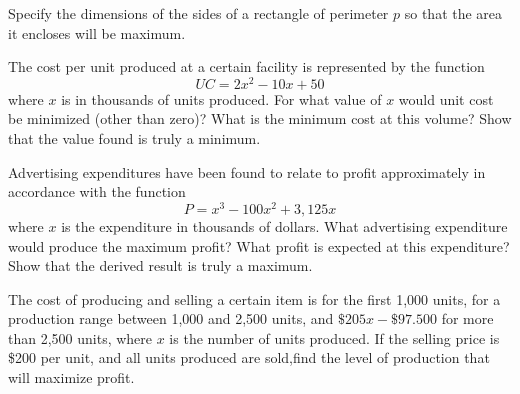 \begin{exercises}
    \begin{exercise}
    \label{sea-09-01}
        Specify the dimensions of the sides of a rectangle of perimeter $p$ so that the area it encloses will be maximum.
    \end{exercise}
    \begin{solution}
    \end{solution}
    
    \begin{exercise}
    \label{sea-09-02}
        The cost per unit produced at a certain facility is represented by the function
        \begin{equation}
            UC = 2x^2-10x+50
        \end{equation}
        where $x$ is in thousands of units produced. For what value of $x$ would unit cost be minimized (other than zero)? What is the minimum cost at this volume? Show that the value found is truly a minimum.
    \end{exercise}
    \begin{solution}
    \end{solution}
    
    \begin{exercise}
    \label{sea-09-03}
        Advertising expenditures have been found to relate to profit approximately in accordance with the function
        \begin{equation}
            P = x^3-100x^2+3,125x
        \end{equation}
        where $x$ is the expenditure in thousands of dollars. What advertising expenditure would produce the maximum profit? What profit is expected at this expenditure? Show that the derived result is truly a maximum.
    \end{exercise}
    \begin{solution}
    \end{solution}
    
    \begin{exercise}
    \label{sea-09-04}
        The cost of producing and selling a certain item is for the first 1,000 units, for a production range between 1,000 and 2,500 units, and $\$205x-\$97.500$ for more than 2,500 units, where $x$ is the number of units produced. If the selling price is \$200 per unit, and all units produced are sold,find the level of production that will maximize profit.
    \end{exercise}
    \begin{solution}
    \end{solution}
    

\end{exercises}
